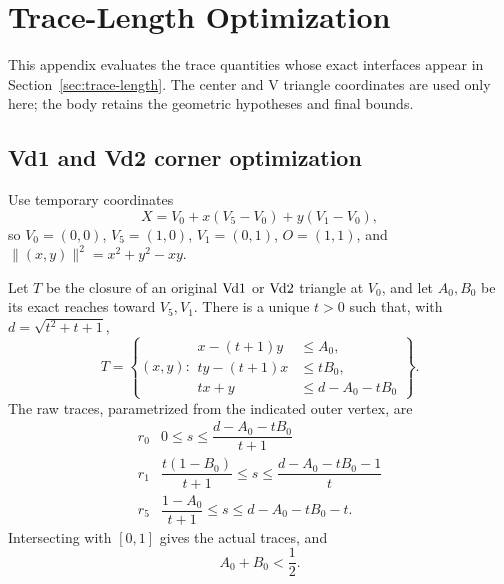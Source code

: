 \section{Trace-Length Optimization}
\label{app:trace-length-optimization}

This appendix evaluates the trace quantities whose exact interfaces appear in
Section~\ref{sec:trace-length}.  The center and V triangle coordinates are
used only here; the body retains the geometric hypotheses and final bounds.

\subsection{Vd1 and Vd2 corner optimization}

Use temporary coordinates
\[
 X=V_0+x(V_5-V_0)+y(V_1-V_0),
\]
so $V_0=(0,0)$, $V_5=(1,0)$, $V_1=(0,1)$, $O=(1,1)$, and
$\lVert(x,y)\rVert^2=x^2+y^2-xy$.

\begin{proposition}
\label{prop:vd-corner-normal-form}
Let $T$ be the closure of an original $\mathrm{Vd1}$ or $\mathrm{Vd2}$ triangle at
$V_0$, and let $A_0,B_0$ be its exact reaches toward $V_5,V_1$.  There is a
unique $t>0$ such that, with $d=\sqrt{t^2+t+1}$,
\begin{equation}
 T=\left\{(x,y):
 \begin{aligned}
 x-(t+1)y&\le A_0,\\
 ty-(t+1)x&\le tB_0,\\
 tx+y&\le d-A_0-tB_0
 \end{aligned}\right\}.
 \label{eq:vd-normal-form}
\end{equation}
The raw traces, parametrized from the indicated outer vertex, are
\begin{equation}
\begin{array}{c|c}
r_0&0\le s\le\dfrac{d-A_0-tB_0}{t+1}\\[6pt]
r_1&\dfrac{t(1-B_0)}{t+1}\le s\le\dfrac{d-A_0-tB_0-1}{t}\\[8pt]
r_5&\dfrac{1-A_0}{t+1}\le s\le d-A_0-tB_0-t.
\end{array}
\label{eq:vd-ray-intervals}
\end{equation}
Intersecting with $[0,1]$ gives the actual traces, and
\begin{equation}
 A_0+B_0<\frac12.
 \label{eq:vd-half-cap}
\end{equation}
\end{proposition}

